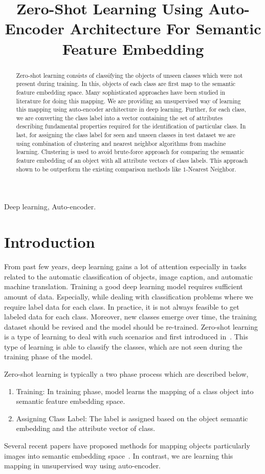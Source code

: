 \documentclass[11pt, conference, english]{IEEEtran}
\title{Zero-Shot Learning Using Auto-Encoder Architecture For Semantic Feature Embedding}
\author{
	\IEEEauthorblockN{Sanidhay Bhambay, Anurag Gupta, Dinesh R}
	\IEEEauthorblockA{Samsung Electro-Mechanics Software India Bangalore Pvt Limited\\
		\{sanidhay.bhambay,anurag.gupta,dimesh.ramegowda\}@samsung.com}%
}
\theoremstyle{plain}
\theoremstyle{definition}
\theoremstyle{remark}
\begin{document}
{}

	\maketitle 
	\begin{abstract} 
		Zero-shot learning consists of classifying the objects of unseen classes which were not present during training. In this, objects of each class are first map to the semantic feature embedding space. Many sophisticated approaches have been studied in literature for doing this mapping. We are providing an unsupervised way of learning this mapping using auto-encoder architecture in deep learning. Further, for each class, we are converting the class label into a vector containing the set of attributes describing fundamental properties required for the identification of particular class. In last, for assigning the class label for seen and unseen classes in test dataset we are using combination of clustering and nearest neighbor algorithms from machine learning. Clustering is used to avoid brute-force approach for comparing the semantic feature embedding of an object with all attribute vectors of class labels. This approach shown to be outperform the existing comparison methods like $1$-Nearest Neighbor.
		
		
	\end{abstract}
	\begin{IEEEkeywords}
		Deep learning, Auto-encoder.
	\end{IEEEkeywords}
	\section{Introduction}
	From past few years, deep learning gains a lot of attention especially in tasks related to the automatic classification of objects, image caption, and automatic machine translation. Training a good deep learning model requires sufficient amount of data. Especially, while dealing with classification problems where we require label data for each class. In practice, it is not always feasible to get labeled data for each class. Moreover, new classes emerge over time, the training dataset should be revised and the model should be re-trained. Zero-shot learning is a type of learning to deal with such scenarios and first introduced in~\cite{palatucci2009zero}. This type of learning is able to classify the classes, which are not seen during the training phase of the model.
	
	Zero-shot learning is typically a two phase process which are described below,
	\begin{enumerate}
		\item Training: In training phase, model learns the mapping of a class object into semantic feature embedding space.
		\item Assigning Class Label: The label is assigned based on the object semantic embedding and the attribute vector of class.
	\end{enumerate}
	Several recent papers have proposed methods for mapping objects particularly images into semantic embedding space~\cite{frome2013devise,lake2011one}. In contrast, we are learning this mapping in unsupervised way using auto-encoder.
\end{document}
